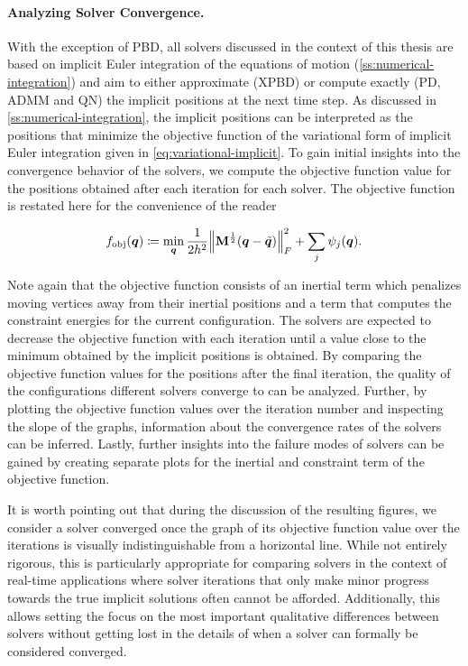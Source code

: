 \paragraph{Analyzing Solver Convergence.}
With the exception of PBD, all solvers discussed in the context of this thesis are based on implicit Euler integration of the equations of 
motion (\cref{ss:numerical-integration}) and aim to either approximate (XPBD) or compute exactly (PD, ADMM and QN) the implicit positions at the next time step. 
As discussed in \autoref{ss:numerical-integration}, the implicit positions can be interpreted as the positions that minimize the objective function of the variational 
form of implicit Euler integration given in \autoref{eq:variational-implicit}. To gain initial insights into the convergence behavior of the solvers, we compute 
the objective function value for the positions obtained after each iteration for each solver. The objective function is restated here for the convenience of the 
reader

\begin{equation}\label{eq:variational-implicit-copy}
    f_{\text{obj}}(\bm{q}) \coloneqq \min_{\bm{q}} \frac{1}{2h^2} \norm{\mathbf{M}^{\frac{1}{2}}(\bm{q} - \tilde{\bm{q}})}^2_F + \sum_j \psi_j(\bm{q}).
\end{equation}

\noindent Note again that the objective function consists of an inertial term which penalizes moving vertices away from their inertial
positions and a term that computes the constraint energies for the current configuration. The solvers are expected to decrease the objective function with each iteration 
until a value close to the minimum obtained 
by the implicit positions is obtained. By comparing the objective function values for the positions after the final iteration, the quality of the configurations different
solvers converge to can be analyzed. Further, by plotting the objective function values over the iteration number and inspecting the slope of the graphs, information about
the convergence rates of the solvers can be inferred. Lastly, further insights into the failure modes of solvers can be gained by creating separate plots for the inertial 
and constraint term of the objective function. 

It is worth pointing out that during the discussion of the resulting figures, we consider a solver converged once the 
graph of its objective function value over the iterations is visually indistinguishable from a horizontal line. While not entirely rigorous, this is particularly appropriate 
for comparing solvers in the context of real-time applications where solver iterations that only make minor progress towards the true implicit solutions often cannot be 
afforded. Additionally, this allows setting the focus on the most important qualitative differences between solvers without getting lost in the details of when a solver can 
formally be considered converged.

